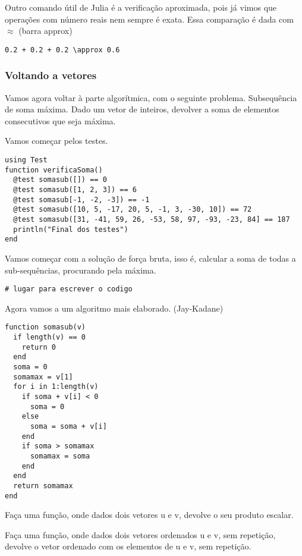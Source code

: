 \documentclass[a4paper]{article}
\begin{document}
 Outro comando útil de Julia é a verificação aproximada, pois já
vimos que operações com número reais nem sempre é exata. Essa
comparação é dada com \(\approx\) (barra approx)

\lstset{language=ein-julia,label= ,caption= ,captionpos=b,numbers=none}
\begin{lstlisting}
0.2 + 0.2 + 0.2 \approx 0.6
\end{lstlisting}

\subsubsection{Voltando a vetores}
\label{sec:org4802cdc}

Vamos agora voltar à parte algorítmica, com o seguinte problema.
Subsequência de soma máxima. Dado um vetor de inteiros, devolver a
soma de elementos consecutivos que seja máxima.

Vamos começar pelos testes.

\lstset{language=ein-julia,label= ,caption= ,captionpos=b,numbers=none}
\begin{lstlisting}
using Test
function verificaSoma()
  @test somasub([]) == 0
  @test somasub([1, 2, 3]) == 6
  @test somasub[-1, -2, -3]) == -1
  @test somasub([10, 5, -17, 20, 5, -1, 3, -30, 10]) == 72
  @test somasub([31, -41, 59, 26, -53, 58, 97, -93, -23, 84] == 187
  println("Final dos testes")
end
\end{lstlisting}

 Vamos começar com a solução de força bruta, isso é, calcular a soma
de todas a sub-sequências, procurando pela máxima.

\lstset{language=ein-julia,label= ,caption= ,captionpos=b,numbers=none}
\begin{lstlisting}
# lugar para escrever o codigo
\end{lstlisting}

Agora vamos a um algoritmo mais elaborado. (Jay-Kadane)
\lstset{language=ein-julia,label= ,caption= ,captionpos=b,numbers=none}
\begin{lstlisting}
function somasub(v)
  if length(v) == 0
    return 0
  end
  soma = 0
  somamax = v[1]
  for i in 1:length(v)
    if soma + v[i] < 0
      soma = 0
    else
      soma = soma + v[i]
    end
    if soma > somamax
      somamax = soma
    end
  end
  return somamax
end
\end{lstlisting}

Faça uma função, onde dados dois vetores u e v, devolve o seu
produto escalar.

 Faça uma função, onde dados dois vetores ordenados u e v,
sem repetição, devolve o vetor ordenado com os elementos de u
e v, sem repetição.
\end{document}
